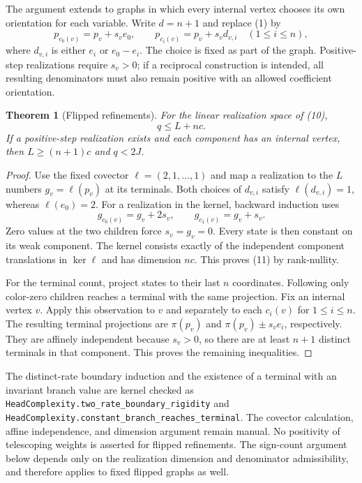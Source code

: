 \documentclass[11pt]{article}
\newtheorem{theorem}{Theorem}
\begin{document}
The argument extends to graphs in which every internal vertex chooses
its own orientation for each variable. Write $d=n+1$ and replace (1) by
\[
 p_{c_0(v)}=p_v+s_v e_0,\qquad
 p_{c_i(v)}=p_v+s_v d_{v,i}\quad(1\le i\le n),
 \tag{10}
\]
where $d_{v,i}$ is either $e_i$ or $e_0-e_i$. The choice is fixed as
part of the graph. Positive-step realizations require $s_v>0$; if a
reciprocal construction is intended, all resulting denominators must
also remain positive with an allowed coefficient orientation.

\begin{theorem}[Flipped refinements]
For the linear realization space of (10),
\[
 q\le L+nc.
 \tag{11}
\]
If a positive-step realization exists and each component has an
internal vertex, then $L\ge(n+1)c$ and $q<2J$.
\end{theorem}
\begin{proof}
Use the fixed covector $\ell=(2,1,\ldots,1)$ and map a realization
to the $L$ numbers $g_v=\ell(p_v)$ at its terminals. Both choices
of $d_{v,i}$ satisfy $\ell(d_{v,i})=1$, whereas $\ell(e_0)=2$.
For a realization in the kernel, backward induction uses
\[
 g_{c_0(v)}=g_v+2s_v,\qquad g_{c_1(v)}=g_v+s_v.
\]
Zero values at the two children force $s_v=g_v=0$. Every state
is then constant on its weak component. The kernel consists exactly
of the independent component translations in $\ker\ell$ and has
dimension $nc$. This proves (11) by rank-nullity.

For the terminal count, project states to their last $n$ coordinates.
Following only color-zero children reaches a terminal with the same
projection. Fix an internal vertex $v$. Apply this observation to
$v$ and separately to each $c_i(v)$ for $1\le i\le n$. The resulting
terminal projections are $\pi(p_v)$ and
$\pi(p_v)\mathbin{\pm}s_v e_i$, respectively. They are affinely
independent because $s_v>0$, so there are at least $n+1$ distinct
terminals in that component. This proves the remaining inequalities.
\end{proof}

The distinct-rate boundary induction and the existence of a terminal
with an invariant branch value are kernel checked as
\texttt{HeadComplexity.two\_rate\_boundary\_rigidity} and
\texttt{HeadComplexity.constant\_branch\_reaches\_terminal}.
The covector calculation, affine independence, and dimension argument
remain manual. No positivity of telescoping weights is asserted for
flipped refinements. The sign-count argument below depends only on
the realization dimension and denominator admissibility, and therefore
applies to fixed flipped graphs as well.
\end{document}
